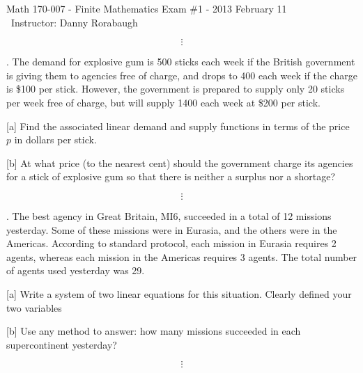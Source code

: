 \documentclass[11pt]{amsart}
\begin{document}
\thispagestyle{empty} %

\noindent Math 170-007 - Finite Mathematics \hfill Exam \#1 - 2013 February 11\\\
\noindent Instructor: Danny Rorabaugh

\vfill

$$\vdots$$

\vfill

. The demand for explosive gum is 500 sticks each week if the British government is giving them to agencies free of charge, and drops to 400 each week if the charge is \$100 per stick. However, the government is prepared to supply only 20 sticks per week free of charge, but will supply 1400 each week at \$200 per stick.

[a] Find the associated linear demand and supply functions in terms of the price $p$ in dollars per stick.

[b] At what price (to the nearest cent) should the government charge its agencies for a stick of explosive gum so that there is neither a surplus nor a shortage?\\

\vfill

$$\vdots$$

\vfill

. The best agency in Great Britain, MI6, succeeded in a total of 12 missions yesterday. Some of these missions were in Eurasia, and the others were in the Americas. According to standard protocol, each mission in Eurasia requires 2 agents, whereas each mission in the Americas requires 3 agents. The total number of agents used yesterday was 29.

[a] Write a system of two linear equations for this situation. Clearly defined your two variables

[b] Use any method to answer: how many missions succeeded in each supercontinent yesterday?

\vfill

$$\vdots$$

\vfill
\end{document}
